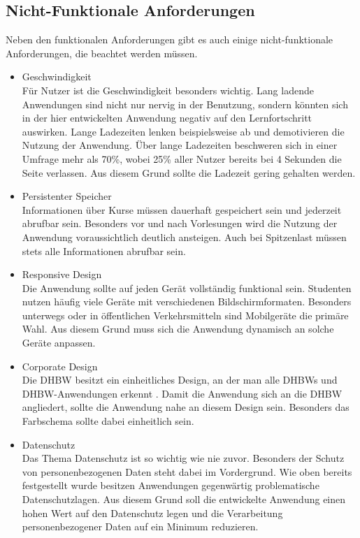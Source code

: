

\subsection{Nicht-Funktionale Anforderungen}
Neben den funktionalen Anforderungen gibt es auch einige nicht-funktionale Anforderungen, die beachtet werden müssen.
\begin{itemize}
    \item Geschwindigkeit\\
        Für Nutzer ist die Geschwindigkeit besonders wichtig.
        Lang ladende Anwendungen sind nicht nur nervig in der Benutzung, sondern könnten sich in der hier entwickelten Anwendung negativ auf den Lernfortschritt auswirken. Lange Ladezeiten lenken beispielsweise ab und demotivieren die Nutzung der Anwendung.
        Über lange Ladezeiten beschweren sich in einer Umfrage mehr als 70\%, wobei 25\% aller Nutzer bereits bei 4 Sekunden die Seite verlassen.\autocite{loadingTimes}
        Aus diesem Grund sollte die Ladezeit gering gehalten werden.
    \item Persistenter Speicher             \\
        Informationen über Kurse müssen dauerhaft gespeichert sein und jederzeit abrufbar sein.
        Besonders vor und nach Vorlesungen wird die Nutzung der Anwendung voraussichtlich deutlich ansteigen.
        Auch bei Spitzenlast müssen stets alle Informationen abrufbar sein.
    \item Responsive Design\\
        Die Anwendung sollte auf jeden Gerät vollständig funktional sein.
        Studenten nutzen häufig viele Geräte mit verschiedenen Bildschirmformaten.
        Besonders unterwegs oder in öffentlichen Verkehrsmitteln sind Mobilgeräte die primäre Wahl.
        Aus diesem Grund muss sich die Anwendung dynamisch an solche Geräte anpassen.
    \item Corporate Design\\
        Die DHBW besitzt ein einheitliches Design, an der man alle DHBWs und DHBW-Anwendungen erkennt \autocite{CD-DHBW}.
        Damit die Anwendung sich an die DHBW angliedert, sollte die Anwendung nahe an diesem Design sein.
        Besonders das Farbschema sollte dabei einheitlich sein. %
    \item Datenschutz\\
        Das Thema Datenschutz ist so wichtig wie nie zuvor.
        Besonders der Schutz von personenbezogenen Daten steht dabei im Vordergrund.
        Wie oben bereits festgestellt wurde besitzen Anwendungen gegenwärtig problematische Datenschutzlagen.
        Aus diesem Grund soll die entwickelte Anwendung einen hohen Wert auf den Datenschutz legen und die Verarbeitung personenbezogener Daten auf ein Minimum reduzieren.
\end{itemize}




